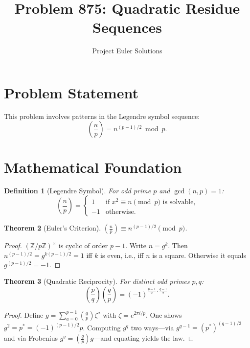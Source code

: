 \documentclass[11pt]{article}
\title{Problem 875: Quadratic Residue Sequences}
\author{Project Euler Solutions}
\date{}
\newtheorem{theorem}{Theorem}
\newtheorem{definition}[theorem]{Definition}
\begin{document}
\maketitle

\section{Problem Statement}

This problem involves patterns in the Legendre symbol sequence:
\[
\left(\frac{n}{p}\right) = n^{(p-1)/2} \bmod p.
\]

\section{Mathematical Foundation}

\begin{definition}[Legendre Symbol]
For odd prime $p$ and $\gcd(n,p)=1$:
\[
\left(\frac{n}{p}\right) = \begin{cases} 1 & \text{if } x^2 \equiv n \pmod{p} \text{ is solvable,} \\ -1 & \text{otherwise.} \end{cases}
\]
\end{definition}

\begin{theorem}[Euler's Criterion]
$\left(\frac{n}{p}\right) \equiv n^{(p-1)/2} \pmod{p}$.
\end{theorem}

\begin{proof}
$(\mathbb{Z}/p\mathbb{Z})^\times$ is cyclic of order $p-1$. Write $n = g^k$. Then $n^{(p-1)/2} = g^{k(p-1)/2} = 1$ iff $k$ is even, i.e., iff $n$ is a square. Otherwise it equals $g^{(p-1)/2} = -1$.
\end{proof}

\begin{theorem}[Quadratic Reciprocity]
For distinct odd primes $p,q$:
\[
\left(\frac{p}{q}\right)\!\left(\frac{q}{p}\right) = (-1)^{\frac{p-1}{2}\cdot\frac{q-1}{2}}.
\]
\end{theorem}

\begin{proof}
Define $g = \sum_{a=0}^{p-1}\left(\frac{a}{p}\right)\zeta^a$ with $\zeta = e^{2\pi i/p}$. One shows $g^2 = p^* = (-1)^{(p-1)/2}p$. Computing $g^q$ two ways---via $g^{q-1} = (p^*)^{(q-1)/2}$ and via Frobenius $g^q = \left(\frac{q}{p}\right)g$---and equating yields the law.
\end{proof}
\end{document}

